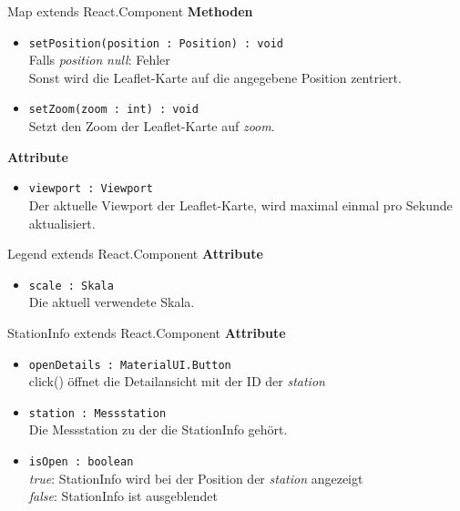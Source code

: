     \begin{Class}{Map extends React.Component}
        \textbf{Methoden}
        \begin{itemize}
            \item \texttt{setPosition(position : Position) : void}
            \\ Falls \emph{position} \emph{null}: Fehler
            \\ Sonst wird die Leaflet-Karte auf die angegebene Position zentriert.
            \item \texttt{setZoom(zoom : int) : void}
            \\ Setzt den Zoom der Leaflet-Karte auf \emph{zoom}.
        \end{itemize}
        \textbf{Attribute}
        \begin{itemize}
            \item \texttt{viewport : Viewport}
            \\ Der aktuelle Viewport der Leaflet-Karte, wird maximal einmal pro Sekunde aktualisiert.
        \end{itemize}
    \end{Class}
    
    \begin{Class}{Legend extends React.Component}
        \textbf{Attribute}
        \begin{itemize}
            \item \texttt{scale : Skala}
            \\ Die aktuell verwendete Skala.
        \end{itemize}
    \end{Class}
    
    \begin{Class}{StationInfo extends React.Component}
        \textbf{Attribute}
        \begin{itemize}
            \item \texttt{openDetails : MaterialUI.Button}
            \\ click() öffnet die Detailansicht mit der ID der \emph{station}
            \item \texttt{station : Messstation}
            \\ Die Messstation zu der die StationInfo gehört.
            \item \texttt{isOpen : boolean}
            \\ \emph{true}: StationInfo wird bei der Position der \emph{station} angezeigt
            \\ \emph{false}: StationInfo ist ausgeblendet
        \end{itemize}
    \end{Class}

